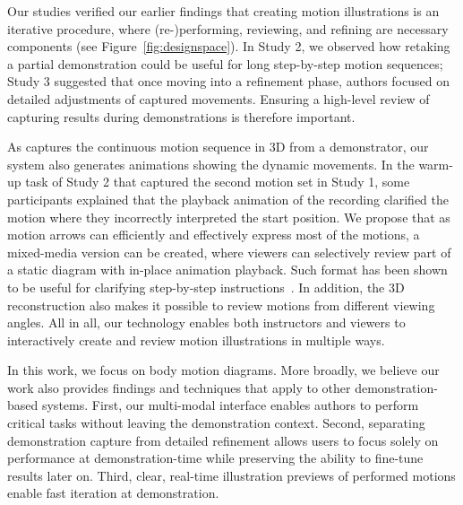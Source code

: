 Our studies verified our earlier findings that creating motion illustrations is an iterative procedure, where (re-)performing, reviewing, and refining are necessary components (see Figure~\ref{fig:designspace}).
In Study 2, we observed how retaking a partial demonstration could be useful for long step-by-step motion sequences; Study 3 suggested that once moving into a refinement phase, authors focused on detailed adjustments of captured movements. Ensuring a high-level review of capturing results during demonstrations is therefore important.

As \systemname{} captures the continuous motion sequence in 3D from a demonstrator, our system also generates animations showing the dynamic movements.
%
In the warm-up task of Study 2 that captured the second motion set in Study 1, some participants explained that the playback animation of the recording clarified the motion where they incorrectly interpreted the start position.
%
We propose that as motion arrows can efficiently and effectively express most of the motions, a mixed-media version can be created, where viewers can selectively review part of a static diagram with in-place animation playback. Such format has been shown to be useful for clarifying step-by-step instructions~\cite{Chi:2012:MAG:2380116.2380130}. In addition, the 3D reconstruction also makes it possible to review motions from different viewing angles.
%
All in all, our technology enables both instructors and viewers to interactively create and review motion illustrations in multiple ways.

In this work, we focus on body motion diagrams.
More broadly, we believe our work also provides findings and techniques that apply to other demonstration-based systems. First, our multi-modal interface enables authors to perform critical tasks without leaving the demonstration context. Second, separating demonstration capture from detailed refinement allows users to focus solely on performance at demonstration-time while preserving the ability to fine-tune results later on. Third, clear, real-time illustration previews of performed motions enable fast iteration at demonstration.
